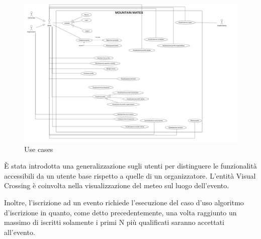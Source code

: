 \begin{figure}[ht!]
    \centering
    \includegraphics[scale=0.55]{Iterazione 0/immagini/UseCases.png}
    \caption{Use cases}
    \label{fig: usecases}
  \end{figure}

È stata introdotta una generalizzazione sugli utenti per distinguere le funzionalità accessibili da un utente base
rispetto a quelle di un organizzatore.
L'entità Visual Crossing è coinvolta nella visualizzazione del meteo sul luogo dell'evento.

Inoltre, l'iscrizione ad un evento richiede l'esecuzione del caso d'uso algoritmo d'iscrizione in quanto, come detto precedentemente,
una volta raggiunto un massimo di iscritti solamente i primi N più qualificati saranno accettati all'evento.